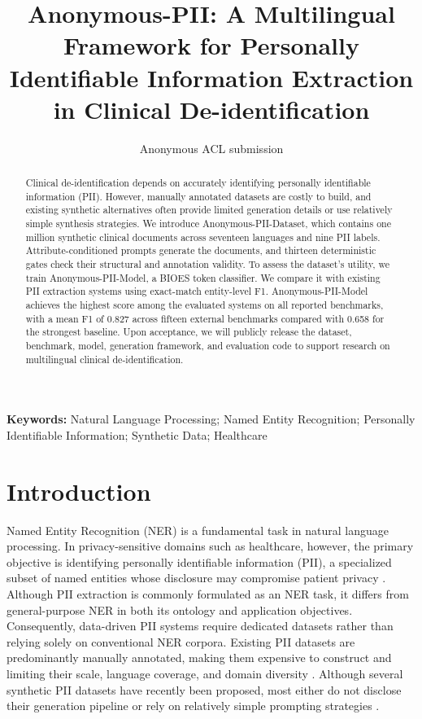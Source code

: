 \documentclass[11pt]{article}
\begin{document}
\title{Anonymous-PII: A Multilingual Framework for Personally Identifiable Information Extraction in Clinical De-identification}

\author{Anonymous ACL submission}

\maketitle



\begin{abstract}
Clinical de-identification depends on accurately identifying personally identifiable information (PII). However, manually annotated datasets are costly to build, and existing synthetic alternatives often provide limited generation details or use relatively simple synthesis strategies. We introduce Anonymous-PII-Dataset, which contains one million synthetic clinical documents across seventeen languages and nine PII labels. Attribute-conditioned prompts generate the documents, and thirteen deterministic gates check their structural and annotation validity. To assess the dataset's utility, we train Anonymous-PII-Model, a BIOES token classifier. We compare it with existing PII extraction systems using exact-match entity-level F1. Anonymous-PII-Model achieves the highest score among the evaluated systems on all reported benchmarks, with a mean F1 of 0.827 across fifteen external benchmarks compared with 0.658 for the strongest baseline. Upon acceptance, we will publicly release the dataset, benchmark, model, generation framework, and evaluation code to support research on multilingual clinical de-identification.
\end{abstract}

\noindent\textbf{Keywords:} Natural Language Processing; Named Entity Recognition; Personally Identifiable Information; Synthetic Data; Healthcare\par\medskip

\section{Introduction}

Named Entity Recognition (NER) is a fundamental task in natural language processing. In privacy-sensitive domains such as healthcare, however, the primary objective is identifying personally identifiable information (PII), a specialized subset of named entities whose disclosure may compromise patient privacy \cite{savkin-etal-2025-spy}. Although PII extraction is commonly formulated as an NER task, it differs from general-purpose NER in both its ontology and application objectives. Consequently, data-driven PII systems require dedicated datasets rather than relying solely on conventional NER corpora. Existing PII datasets are predominantly manually annotated, making them expensive to construct and limiting their scale, language coverage, and domain diversity \cite{neamatullah2008automated,uzuner2007evaluating,stubbs2015automated}. Although several synthetic PII datasets have recently been proposed, most either do not disclose their generation pipeline or rely on relatively simple prompting strategies \cite{ai4privacy_openpii_1_5m_2026,gretel-pii-docs-en-v1,nemotron-pii}.
\end{document}
